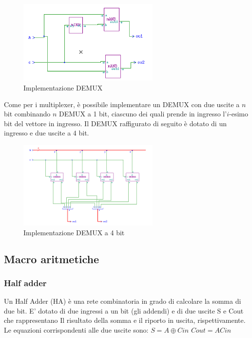 \documentclass[10pt]{article}
\begin{document}
\begin{itemize}
    \begin{figure}[H]
    \begin{minipage}[b]{0.4\textwidth}
    \centering
    \includegraphics[width=70mm]{demux1}
    \caption{Implementazione DEMUX}
    \label{ }
    \end{minipage}
    \end{figure}

Come per i multiplexer, è possibile implementare un DEMUX con due uscite a $n$ bit combinando $n$ DEMUX a 1 bit, ciascuno dei quali prende in ingresso l'$i$-esimo bit del vettore in ingresso.
Il DEMUX raffigurato di seguito è dotato di un ingresso e due uscite a 4 bit.

\begin{figure}[H]
    \begin{minipage}[b]{0.4\textwidth}
        \includegraphics[width=70mm]{demux4}
        \caption{Implementazione DEMUX a 4 bit}
        \label{ }
    \end{minipage}
\end{figure}

\subsection{Macro aritmetiche}
\subsubsection{Half adder}
Un Half Adder (HA) è una rete combinatoria in grado di calcolare la somma di due bit. E' dotato di due ingressi a un bit (gli addendi) e di due uscite S e Cout che rappresentano Il
risultato della somma e il riporto in uscita, rispettivamente.
Le equazioni corrispondenti alle due uscite sono:
$S = A \oplus Cin$
$Cout = ACin$


\end{itemize}
\end{document}
